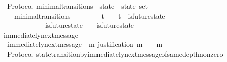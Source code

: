 \begin{isabellebody}
\endisatagproof
{\isafoldproof}%
%
\isadelimproof
\isanewline
%
\endisadelimproof
\isanewline
\isanewline
{}\isamarkupfalse%
\ {\isacharparenleft}\ Protocol{\isacharparenright}\ minimal{\isacharunderscore}transitions\ {\isacharcolon}{\isacharcolon}\ {\isachardoublequoteopen}{\isacharparenleft}state\ {\isacharasterisk}\ state{\isacharparenright}\ set{\isachardoublequoteclose}\isanewline
\ \ \isanewline
\ \ \ \ {\isachardoublequoteopen}minimal{\isacharunderscore}transitions\ {\isasymequiv}\ {\isacharbraceleft}{\isacharparenleft}{\isasymsigma}{\isacharcomma}\ {\isasymsigma}{\isacharprime}{\isacharparenright}\ {\isacharbar}\ {\isasymsigma}\ {\isasymsigma}{\isacharprime}{\isachardot}\ {\isasymsigma}\ {\isasymin}\ {\isasymSigma}t\ {\isasymand}\ {\isasymsigma}{\isacharprime}\ {\isasymin}\ {\isasymSigma}t\ {\isasymand}\ is{\isacharunderscore}future{\isacharunderscore}state\ {\isacharparenleft}{\isasymsigma}{\isacharcomma}\ {\isasymsigma}{\isacharprime}{\isacharparenright}\ {\isasymand}\ {\isasymsigma}\ {\isasymnoteq}\ {\isasymsigma}{\isacharprime}\isanewline
\ \ \ \ \ \ {\isasymand}\ {\isacharparenleft}{\isasymnexists}\ {\isasymsigma}{\isacharprime}{\isacharprime}{\isachardot}\ {\isasymsigma}{\isacharprime}{\isacharprime}\ {\isasymin}\ {\isasymSigma}\ {\isasymand}\ is{\isacharunderscore}future{\isacharunderscore}state\ {\isacharparenleft}{\isasymsigma}{\isacharcomma}\ {\isasymsigma}{\isacharprime}{\isacharprime}{\isacharparenright}\ {\isasymand}\ is{\isacharunderscore}future{\isacharunderscore}state\ {\isacharparenleft}{\isasymsigma}{\isacharprime}{\isacharprime}{\isacharcomma}\ {\isasymsigma}{\isacharprime}{\isacharparenright}\ {\isasymand}\ {\isasymsigma}\ {\isasymnoteq}\ {\isasymsigma}{\isacharprime}{\isacharprime}\ {\isasymand}\ {\isasymsigma}{\isacharprime}{\isacharprime}\ {\isasymnoteq}\ {\isasymsigma}{\isacharprime}{\isacharparenright}{\isacharbraceright}{\isachardoublequoteclose}\isanewline
\isanewline
\isanewline
{}\isamarkupfalse%
\ immediately{\isacharunderscore}next{\isacharunderscore}message\ \isanewline
\ \ {\isachardoublequoteopen}immediately{\isacharunderscore}next{\isacharunderscore}message\ {\isacharequal}\ {\isacharparenleft}{\isasymlambda}{\isacharparenleft}{\isasymsigma}{\isacharcomma}m{\isacharparenright}{\isachardot}\ justification\ m\ {\isasymsubseteq}\ {\isasymsigma}\ {\isasymand}\ m\ {\isasymnotin}\ {\isasymsigma}{\isacharparenright}{\isachardoublequoteclose}\isanewline
\isanewline
{}\isamarkupfalse%
\ {\isacharparenleft}\ Protocol{\isacharparenright}\ state{\isacharunderscore}transition{\isacharunderscore}by{\isacharunderscore}immediately{\isacharunderscore}next{\isacharunderscore}message{\isacharunderscore}of{\isacharunderscore}same{\isacharunderscore}depth{\isacharunderscore}non{\isacharunderscore}zero{\isacharcolon}\ \isanewline

\end{isabellebody}
